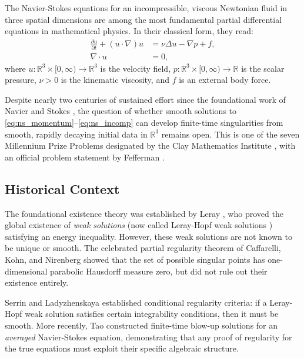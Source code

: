 \documentclass[12pt, a4paper]{article}
\theoremstyle{plain}
\theoremstyle{definition}
\theoremstyle{remark}
\newcommand{\R}{\mathbb{R}}
\begin{document}
The Navier-Stokes equations for an incompressible, viscous Newtonian fluid
in three spatial dimensions are among the most fundamental partial differential
equations in mathematical physics. In their classical form, they read:
\begin{align}
  \frac{\partial u}{\partial t} + (u \cdot \nabla)u &= \nu \Delta u - \nabla p + f,
  \label{eq:ns_momentum} \\
  \nabla \cdot u &= 0,
  \label{eq:ns_incomp}
\end{align}
where $u: \R^3 \times [0,\infty) \to \R^3$ is the velocity field,
$p: \R^3 \times [0,\infty) \to \R$ is the scalar pressure,
$\nu > 0$ is the kinematic viscosity, and $f$ is an external body force.

Despite nearly two centuries of sustained effort since the foundational work
of Navier \citep{Navier1822} and Stokes \citep{Stokes1845}, the question of
whether smooth solutions to \eqref{eq:ns_momentum}--\eqref{eq:ns_incomp}
can develop finite-time singularities from smooth, rapidly decaying initial data
in $\R^3$ remains open. This is one of the seven Millennium Prize Problems
designated by the Clay Mathematics Institute \citep{ClayNS}, with an official
problem statement by Fefferman \citep{Fefferman2006}.

\subsection{Historical Context}

The foundational existence theory was established by Leray \citep{Leray1934},
who proved the global existence of \emph{weak solutions} (now called Leray-Hopf
weak solutions \citep{Hopf1951}) satisfying an energy inequality. However,
these weak solutions are not known to be unique or smooth. The celebrated
partial regularity theorem of Caffarelli, Kohn, and Nirenberg \citep{CKN1982}
showed that the set of possible singular points has one-dimensional parabolic
Hausdorff measure zero, but did not rule out their existence entirely.

Serrin \citep{LadyzhenskayaSerrin1967} and Ladyzhenskaya \citep{Ladyzhenskaya1969}
established conditional regularity criteria: if a Leray-Hopf weak solution
satisfies certain integrability conditions, then it must be smooth. More recently,
Tao \citep{Tao2016} constructed finite-time blow-up solutions for an
\emph{averaged} Navier-Stokes equation, demonstrating that any proof of
regularity for the true equations must exploit their specific algebraic structure.
\end{document}
